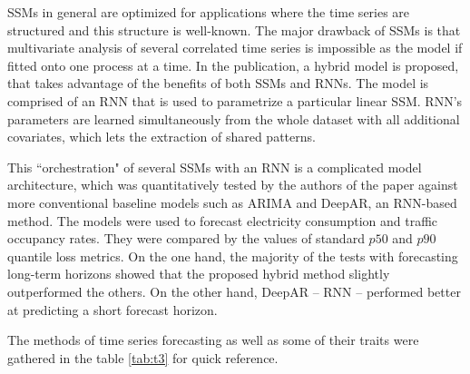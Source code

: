 \documentclass[13pt, a4paper]{article}
\begin{document}
\begin{enumerate}
SSMs in general are optimized for applications where the time series are structured and this structure is well-known. The major drawback of SSMs is that multivariate analysis of several correlated time series is impossible as the model if fitted onto one process at a time. In the publication, a hybrid model is proposed, that takes advantage of the benefits of both SSMs and RNNs. The model is comprised of an RNN that is used to parametrize a particular linear SSM. RNN's parameters are learned simultaneously from the whole dataset with all additional covariates, which lets the extraction of shared patterns.

This ``orchestration" of several SSMs with an RNN is a complicated model architecture, which was quantitatively tested by the authors of the paper \cite{rangapuram2018deep} against more conventional baseline models such as ARIMA and DeepAR, an RNN-based method. The models were used to forecast electricity consumption and traffic occupancy rates. They were compared by the values of standard $p50$ and $p90$ quantile loss metrics. On the one hand, the majority of the tests with forecasting long-term horizons showed that the proposed hybrid method slightly outperformed the others. On the other hand, DeepAR -- RNN -- performed better at predicting a short forecast horizon.
\end{enumerate}

The methods of time series forecasting as well as some of their traits were gathered in the table \ref{tab:t3} for quick reference.
\end{document}

